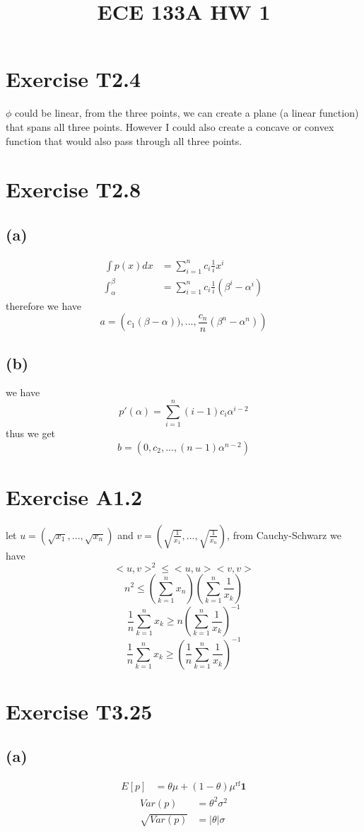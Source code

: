 
\title{ECE 133A HW 1}

\maketitle
\section*{Exercise T2.4}
$\phi$ could be linear, from the three points, we can create a plane (a linear function) that spans all three points. However I could also create a concave or convex function that would also pass through all three points.
\section*{Exercise T2.8}
\subsection*{(a)}
\begin{align*}
\int p(x)dx&=\sum_{i=1}^{n}c_i\frac{1}{i}x^{i}\\
\int_{\alpha}^\beta&=\sum_{i=1}^{n}c_i\frac{1}{i}(\beta^i-\alpha^i)
\end{align*}
therefore we have
$$a=\boxed{\left(c_1(\beta-\alpha)),...,\frac{c_n}{n}(\beta^n-\alpha^n)\right)}$$
\subsection*{(b)}
we have
$$p'(\alpha)=\sum_{i=1}^{n}(i-1)c_i \alpha^{i-2}$$
thus we get
$$b=\boxed{\left(0,c_2,...,(n-1)\alpha^{n-2}\right)}$$
\section*{Exercise A1.2}
let $u=(\sqrt{x_1},...,\sqrt{x_n})$ and $v=\left(\sqrt{\frac{1}{x_1}},...,\sqrt{\frac{1}{x_n}}\right)$, from Cauchy-Schwarz we have
$$<u,v>^2\leq<u,u><v,v>$$
$$n^2\leq\left(\sum_{k=1}^{n}x_n\right)\left(\sum_{k=1}^{n}\frac{1}{x_k}\right)$$
$$\frac{1}{n}\sum_{k=1}^{n}x_k\geq n\left(\sum_{k=1}^n\frac{1}{x_k}\right)^{-1}$$
$$\frac{1}{n}\sum_{k=1}^{n}x_k\geq\left(\frac{1}{n}\sum_{k=1}^n\frac{1}{x_k}\right)^{-1}$$
\section*{Exercise T3.25}
\subsection*{(a)}
\begin{align*}
	E[p]&=\boxed{\theta\mu+(1-\theta)\mu^{\text{rf}}\textbf{1}}
\end{align*}
\begin{align*}
	Var(p)&=\theta^2\sigma^2\\
	\sqrt{Var(p)}&=\boxed{|\theta|\sigma}
\end{align*}
